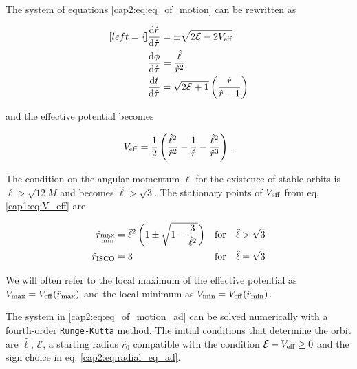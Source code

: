 The system of equations \ref{cap2:eq:eq_of_motion} can be rewritten as

\begin{subequations}
    \begin{align}[left = {\empheqlbrace}]
        &\dv{\hat r}{\hat \tau} = \pm \sqrt{2 \mathcal E - 2 V_{\rm eff}}
        \label{cap2:eq:radial_eq_ad} \\
        &\dv{\phi}{\hat \tau} = \frac{\hat \ell}{\hat r^2}
        \label{cap2:eq:angular_eq_ad} \\
        &\dv{t}{\hat \tau} = \sqrt{2 \mathcal E + 1}
        \left(\frac{\hat r}{\hat r - 1}\right) \label{cap2:eq:time_eq_ad}
    \end{align}
    \label{cap2:eq:eq_of_motion_ad}
\end{subequations}

and the effective potential becomes

\begin{equation}
    V_{\rm eff} = \frac{1}{2} \left(\frac{\hat \ell^2}{\hat r^2}
    - \frac{1}{\hat r} - \frac{\hat \ell^2}{\hat r^3} \right) \, .
\end{equation}

The condition on the angular momentum $\ell$ for the existence of stable orbits
is $\ell > \sqrt{12} M$ and becomes $\hat \ell > \sqrt{3}$.
The stationary points of $V_{\rm eff}$ from eq. \ref{cap1:eq:V_eff} are

\begin{subequations}
    \begin{align}
        \hat r_{\substack{\rm max \\ \rm min}} &= \hat \ell^2
        \left(1 \pm \sqrt{1 - \frac{3}{\hat \ell^2}} \right)
        &&{\rm for} \quad \hat \ell > \sqrt{3} \\
        \hat r_{\rm ISCO} &= 3
        &&{\rm for} \quad \hat \ell = \sqrt{3}
    \end{align}
\end{subequations}

We will often refer to the local maximum of the effective potential as
$V_{\rm max} = V_{\rm eff}(\hat r_{\rm max})$ and the local minimum as
$V_{\rm min} = V_{\rm eff}(\hat r_{\rm min})$.

The system in \ref{cap2:eq:eq_of_motion_ad} can be solved numerically with
a fourth-order \texttt{Runge-Kutta} method.
The initial conditions that determine the orbit are $\hat \ell$,
$\mathcal E$, a starting radius $\hat r_0$ compatible with the condition
$\mathcal E - V_{\rm eff} \geq 0$ and the sign choice in eq.
\ref{cap2:eq:radial_eq_ad}.

